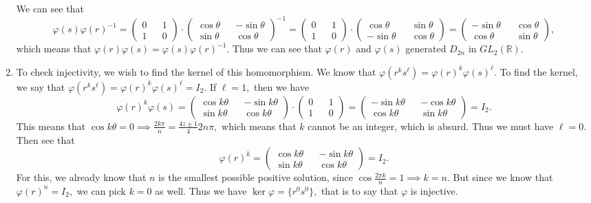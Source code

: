\documentclass{article}
\begin{document}
\begin{enumerate}
We can see that $$\varphi(s)\varphi(r)^{-1}= \begin{pmatrix}
	0 && 1\\
	1 && 0
\end{pmatrix}\cdot \begin{pmatrix}
	\cos \theta && -\sin \theta \\
	\sin \theta && \cos \theta
\end{pmatrix}^{-1}=\begin{pmatrix}
0 && 1\\
1 && 0
\end{pmatrix}\cdot \begin{pmatrix}
\cos \theta && \sin \theta \\
-\sin \theta && \cos \theta
\end{pmatrix} = \begin{pmatrix}
	-\sin \theta && \cos \theta \\
	\cos \theta && \sin \theta
\end{pmatrix},$$ which means that $\varphi(r)\varphi(s)=\varphi(s)\varphi(r)^{-1}.$ Thus we can see that $\varphi(r)$ and $\varphi(s)$ generated $D_{2n}$ in 
$GL_2(\mathbb{R}).$
\item To check injectivity, we wish to find the kernel of this homomorphism. We know that $\varphi(r^ks^\ell)=\varphi(r)^k\varphi(s)^\ell.$ To find the 
kernel, we say that $\varphi(r^ks^\ell)=\varphi(r)^k\varphi(s)^\ell=I_2.$ If $\ell=1,$ then we have $$\varphi(r)^k\varphi(s)= \begin{pmatrix}
	\cos k\theta && -\sin k\theta \\
	\sin k\theta && \cos k\theta
\end{pmatrix}\cdot \begin{pmatrix}
0 && 1 \\
1 && 0
\end{pmatrix} = \begin{pmatrix}
-\sin k\theta && -\cos k\theta \\
\cos k\theta && \sin k\theta
\end{pmatrix}= I_2.$$ This means that $\cos k\theta=0 \implies \frac{2k\pi}{n}= \frac{4z \pm 1}{4}2n\pi,$ which means that $k$ cannot be an integer, which 
is absurd. Thus we must have $\ell=0.$ Then see that  $$\varphi(r)^k= \begin{pmatrix}
\cos k\theta && -\sin k\theta \\
\sin k\theta && \cos k\theta
\end{pmatrix}=I_2.$$ For this, we already know that $n$ is the smallest possible positive solution, since $\cos \frac{2\pi k}{n}=1 \implies k=n.$ But since 
we know that $\varphi(r)^n=I_2,$ we can pick $k=0$ as well. Thus we have $\ker \varphi = \{r^0s^0\},$ that is to say that $\varphi$ is injective.  
\end{enumerate}
\end{document}
